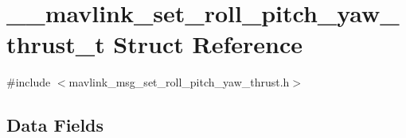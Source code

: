 \hypertarget{struct____mavlink__set__roll__pitch__yaw__thrust__t}{\section{\-\_\-\-\_\-mavlink\-\_\-set\-\_\-roll\-\_\-pitch\-\_\-yaw\-\_\-thrust\-\_\-t Struct Reference}
\label{struct____mavlink__set__roll__pitch__yaw__thrust__t}
}


{\ttfamily \#include $<$mavlink\-\_\-msg\-\_\-set\-\_\-roll\-\_\-pitch\-\_\-yaw\-\_\-thrust.\-h$>$}

\subsection*{Data Fields}
